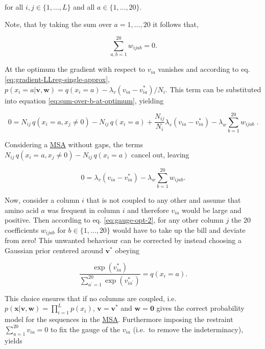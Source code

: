 \documentclass[11pt,a4paper,twoside]{book}
\newcommand{\eq}{\!=\!}
\newcommand{\seq}{\mathbf{x}}
\renewcommand{\v}{\mathbf{v}}
\newcommand{\via}{v_{ia}}
\newcommand{\w}{\mathbf{w}}
\newcommand{\wijab}{w_{ijab}}
\theoremstyle{definition}
\theoremstyle{definition}
\theoremstyle{remark}
\begin{document}
for all \(i,j \in \{1,\ldots,L\}\) and all \(a \in \{1,\ldots,20\}\).

Note, that by taking the sum over \(a=1,\ldots, 20\) it follows that,

\begin{equation}
    \sum_{a,b=1}^{20} \wijab  = 0.
\label{eq:zero-sum-wij}
\end{equation}

At the optimum the gradient with respect to \(\via\) vanishes and
according to eq. \eqref{eq:gradient-LLreg-single-approx},
\(p(x_i=a|\v,\w) = q(x_i=a) - \lambda_v (\via - \via^*) / N_i\). This
term can be substituted into equation \eqref{eq:sum-over-b-at-optimum},
yielding

\begin{equation}
    0 =  N_{ij} \, q(x_i \eq a, x_j \ne 0)  - N_{ij} \, q(x_i=a) + \frac{N_{ij}}{N_i}\lambda_v (\via - \via^*)  - \lambda_w \sum_{b=1}^{20} \wijab \; .
\label{eq:gauge-opt-1}
\end{equation}

Considering a \protect\hyperlink{abbrev}{MSA} without gaps, the terms
\(N_{ij} \, q(x_i \eq a, x_j \ne 0) - N_{ij} \, q(x_i=a)\) cancel out,
leaving

\begin{equation}
    0 =  \lambda_v (\via - \via^*)  - \lambda_w \sum_{b=1}^{20} \wijab .
\label{eq:gauge-opt-2}
\end{equation}

Now, consider a column \(i\) that is not coupled to any other and assume
that amino acid \(a\) was frequent in column \(i\) and therefore
\(\via\) would be large and positive. Then according to eq.
\eqref{eq:gauge-opt-2}, for any other column \(j\) the 20 coefficients
\(\wijab\) for \(b \in \{1,\ldots,20\}\) would have to take up the bill
and deviate from zero! This unwanted behaviour can be corrected by
instead choosing a Gaussian prior centered around \(\v^*\) obeying

\begin{equation}
  \frac{\exp(\via^*)}{\sum_{a^{\prime}=1}^{20} \exp(v_{ia^{\prime}}^*)} = q(x_i=a) .
\end{equation}

This choice ensures that if no columns are coupled, i.e.
\(p(\seq | \v,\w) = \prod_{i=1}^L p(x_i)\), \(\v=\v^*\) and
\(\w= \mathbf{0}\) gives the correct probability model for the sequences
in the \protect\hyperlink{abbrev}{MSA}. Furthermore imposing the
restraint \(\sum_{a=1}^{20} \via \eq 0\) to fix the gauge of the
\(\via\) (i.e.~to remove the indeterminacy), yields
\end{document}
